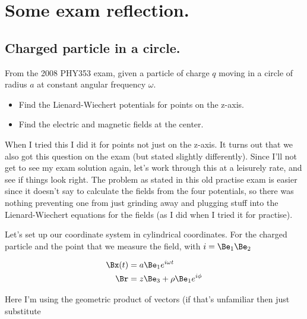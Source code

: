 
%

\chapter{Some exam reflection.}
\label{chap:relativisticElectrodynamicsExamReflection}
{}
\date{April 13, 2011}

\beginArtWithToc

\section{Charged particle in a circle.}

From the 2008 PHY353 exam, given a particle of charge $q$ moving in a circle of radius $a$ at constant angular frequency $\omega$.

\begin{itemize}
\item Find the Lienard-Wiechert potentials for points on the z-axis.
\item Find the electric and magnetic fields at the center.
\end{itemize}

When I tried this I did it for points not just on the z-axis.  It turns out that we also got this question on the exam (but stated slightly differently).  Since I'll not get to see my exam solution again, let's work through this at a leisurely rate, and see if things look right.  The problem as stated in this old practise exam is easier since it doesn't say to calculate the fields from the four potentials, so there was nothing preventing one from just grinding away and plugging stuff into the Lienard-Wiechert equations for the fields (as I did when I tried it for practise).

Let's set up our coordinate system in cylindrical coordinates.  For the charged particle and the point that we measure the field, with $i = \Be_1 \Be_2$

\begin{align}\label{eqn:relativisticElectrodynamicsExamReflection:n}
\Bx(t) &= a \Be_1 e^{i \omega t} \\
\Br &= z \Be_3 + \rho \Be_1 e^{i \phi}
\end{align}

Here I'm using the geometric product of vectors (if that's unfamiliar then just substitute

